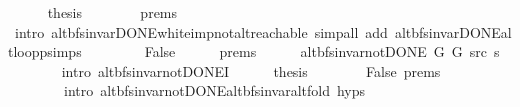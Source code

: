 \begin{isabellebody}
\ \ \ \ \isamarkupfalse%
\ {\isacharquery}{\kern0pt}thesis\isanewline
\ \ \ \ \ \ \isamarkupfalse%
\ {\isachardoublequoteopen}{}{\isachardot}{\kern0pt}prems{\isachardoublequoteclose}{\isacharparenleft}{\kern0pt}{}{\isacharparenright}{\kern0pt}\isanewline
\ \ \ \ \ \ \isamarkupfalse%
\ {\isacharparenleft}{\kern0pt}intro\ alt{\isacharunderscore}{\kern0pt}bfs{\isacharunderscore}{\kern0pt}invar{\isacharunderscore}{\kern0pt}DONE{\isachardot}{\kern0pt}white{\isacharunderscore}{\kern0pt}imp{\isacharunderscore}{\kern0pt}not{\isacharunderscore}{\kern0pt}alt{\isacharunderscore}{\kern0pt}reachable{\isacharparenright}{\kern0pt}\ {\isacharparenleft}{\kern0pt}simp{\isacharunderscore}{\kern0pt}all\ add{\isacharcolon}{\kern0pt}\ alt{\isacharunderscore}{\kern0pt}bfs{\isacharunderscore}{\kern0pt}invar{\isacharunderscore}{\kern0pt}DONE{\isachardot}{\kern0pt}alt{\isacharunderscore}{\kern0pt}loop{\isacharunderscore}{\kern0pt}psimps{\isacharparenright}{\kern0pt}\isanewline
\ \ \isamarkupfalse%
\isanewline
\ \ \ \ \isamarkupfalse%
\ False\isanewline
\ \ \ \ \isamarkupfalse%
\ {\isachardoublequoteopen}{}{\isachardot}{\kern0pt}prems{\isachardoublequoteclose}{\isacharparenleft}{\kern0pt}{}{\isacharparenright}{\kern0pt}\isanewline
\ \ \ \ \isamarkupfalse%
\ {\isachardoublequoteopen}alt{\isacharunderscore}{\kern0pt}bfs{\isacharunderscore}{\kern0pt}invar{\isacharunderscore}{\kern0pt}not{\isacharunderscore}{\kern0pt}DONE{\isacharprime}{\kern0pt}\ G{}\ G{}\ src\ s{\isachardoublequoteclose}\isanewline
\ \ \ \ \ \ \isamarkupfalse%
\ {\isacharparenleft}{\kern0pt}intro\ alt{\isacharunderscore}{\kern0pt}bfs{\isacharunderscore}{\kern0pt}invar{\isacharunderscore}{\kern0pt}not{\isacharunderscore}{\kern0pt}DONE{\isacharprime}{\kern0pt}I{\isacharparenright}{\kern0pt}\isanewline
\ \ \ \ \isamarkupfalse%
\ {\isacharquery}{\kern0pt}thesis\isanewline
\ \ \ \ \ \ \isamarkupfalse%
\ False\ {\isachardoublequoteopen}{}{\isachardot}{\kern0pt}prems{\isachardoublequoteclose}{\isacharparenleft}{\kern0pt}{}{\isacharparenright}{\kern0pt}\isanewline
\ \ \ \ \ \ \isamarkupfalse%
\isanewline
\ \ \ \ \ \ \ \ {\isacharparenleft}{\kern0pt}intro\ alt{\isacharunderscore}{\kern0pt}bfs{\isacharunderscore}{\kern0pt}invar{\isacharunderscore}{\kern0pt}not{\isacharunderscore}{\kern0pt}DONE{\isachardot}{\kern0pt}alt{\isacharunderscore}{\kern0pt}bfs{\isacharunderscore}{\kern0pt}invar{\isacharunderscore}{\kern0pt}alt{\isacharunderscore}{\kern0pt}fold\ {\isachardoublequoteopen}{}{\isachardot}{\kern0pt}hyps{\isachardoublequoteclose}{\isacharparenright}{\kern0pt}\isanewline

\end{isabellebody}
